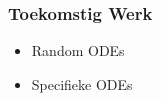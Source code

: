 \documentclass[18pt,aspectratio=149]{beamer}
\begin{document}
\begin{frame}
    \frametitle{Toekomstig Werk}
    \begin{itemize}
        \item Random ODEs
        \item Specifieke ODEs
    \end{itemize}
\end{frame}

\end{document}
